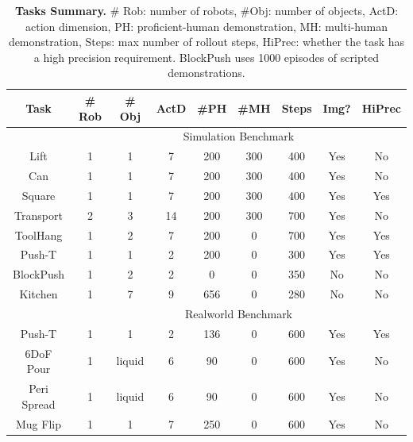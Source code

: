 \documentclass[Afour,sageh,times]{sagej}
\begin{document}
\begin{table}
\centering
\setlength\tabcolsep{2 pt}
\small
\begin{tabular}{c|cccccccc}
\toprule
Task      & \# Rob & \# Obj & ActD & \#PH & \#MH & Steps & Img? & HiPrec \\
\midrule
\multicolumn{1}{c}{} & \multicolumn{8}{c}{Simulation Benchmark} \\
\midrule
Lift      & 1      & 1      & 7    & 200   & 300   & 400       & Yes    & No       \\
Can       & 1      & 1      & 7    & 200   & 300   & 400       & Yes    & No       \\
Square    & 1      & 1      & 7    & 200   & 300   & 400       & Yes    & Yes      \\
Transport & 2      & 3      & 14   & 200   & 300   & 700       & Yes    & No       \\
ToolHang  & 1      & 2      & 7    & 200   & 0     & 700       & Yes    & Yes      \\
\midrule
Push-T    & 1      & 1      & 2    & 200   & 0     & 300       & Yes    & Yes      \\
\midrule
BlockPush & 1      & 2      & 2    & 0     & 0     & 350       & No     & No       \\
\midrule
Kitchen   & 1      & 7      & 9    & 656   & 0     & 280       & No     & No      \\
\midrule
\multicolumn{1}{c}{} & \multicolumn{8}{c}{Realworld Benchmark} \\
\midrule
Push-T    & 1      & 1      & 2    & 136   & 0     & 600       & Yes    & Yes  \\
6DoF Pour   & 1    & liquid      & 6    & 90   & 0     & 600       & Yes    & No  \\
Peri Spread   & 1      & liquid      & 6    & 90   & 0     & 600       & Yes    & No  \\
Mug Flip  & 1      & 1      & 7    & 250   & 0     & 600       & Yes    & No  \\
\bottomrule
\end{tabular}
\caption{\textbf{Tasks Summary.} \# Rob: number of robots, \#Obj: number of objects, ActD: action dimension, PH: proficient-human demonstration, MH: multi-human demonstration, Steps: max number of rollout steps, HiPrec: whether the task has a high precision requirement. BlockPush uses 1000 episodes of scripted  demonstrations.}
\label{tab:robomimic_tasks}
\vspace{-5mm}
\end{table}
\end{document}
